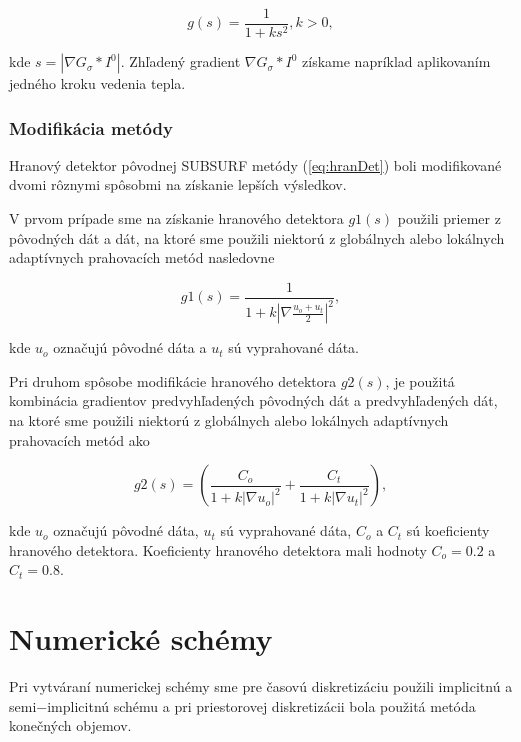 \documentclass[a4paper,11pt,oneside]{article}%
\begin{document}
\begin{equation} \label{eq:hranDet}
g(s) = \frac{1}{1+ks^2}, k > 0,
\end{equation}

kde $s = |\nabla G_\sigma*I^0|$. Zhľadený gradient $\nabla G_\sigma*I^0$ získame napríklad aplikovaním jedného kroku vedenia tepla. 

\subsubsection{Modifikácia metódy}   \label{HranDet}

Hranový detektor pôvodnej SUBSURF metódy (\ref{eq:hranDet}) boli modifikované dvomi rôznymi spôsobmi na získanie lepších výsledkov.

V prvom prípade sme na získanie hranového detektora $g1(s)$ použili priemer z pôvodných dát a dát, na ktoré sme použili niektorú z globálnych alebo lokálnych adaptívnych prahovacích metód nasledovne

\begin{equation}
g1(s) = \frac{1}{1 + k|\nabla \frac{u_o + u_t}{2}|^2},
\end{equation}

kde $u_o$ označujú pôvodné dáta a $u_t$ sú vyprahované dáta. 

Pri druhom spôsobe modifikácie hranového detektora $g2(s)$\cite{sora}, je použitá kombinácia gradientov predvyhľadených pôvodných dát a predvyhľadených dát, na ktoré sme použili niektorú z globálnych alebo lokálnych adaptívnych prahovacích metód ako

\begin{equation} \label{eq:hdet2}
g2(s) = (\frac{C_o}{1 + k|\nabla u_o|^2} + \frac{C_t}{1 + k|\nabla u_t|^2}),
\end{equation}

kde $u_o$ označujú pôvodné dáta, $u_t$ sú vyprahované dáta, $C_o$ a $C_t$ sú koeficienty hranového detektora. Koeficienty hranového detektora mali hodnoty $C_o = 0.2$ a $C_t = 0.8$.

\newpage
\section{Numerické schémy}

Pri vytváraní numerickej schémy sme pre časovú diskretizáciu použili implicitnú a semi$-$implicitnú schému a pri priestorovej diskretizácii bola použitá metóda konečných objemov.

\end{document}
